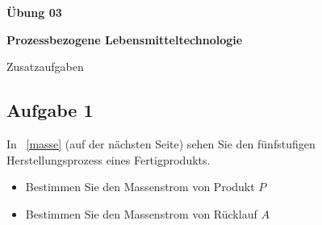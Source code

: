 \documentclass[a4paper,11pt]{article}
\begin{document}


\begin{center}
\LARGE
\color{uniblau}
\textbf{Übung 03} \par \vspace*{2mm}
\large \color{miugray!50!black} \textbf{Prozessbezogene Lebensmitteltechnologie}\par 
\normalsize Zusatzaufgaben
\end{center}
\par 


\color{miudiutex}




\subsection*{Aufgabe 1}
In \figurename{~\ref{masse}} (auf der nächsten Seite) sehen Sie den fünfstufigen Herstellungsprozess eines Fertigprodukts. 
\begin{itemize}
\item Bestimmen Sie den Massenstrom von Produkt $P$
\item Bestimmen Sie den Massenstrom von Rücklauf $A$
\end{itemize}
\end{document}
